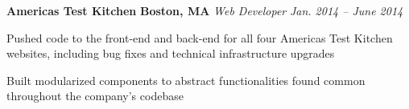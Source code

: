 \item
\headerrow
{\textbf{Americas Test Kitchen}}
{\textbf{Boston, MA}}
\headerrow
{\emph{Web Developer}}
{\emph{Jan. 2014 -- June 2014}}
\begin{itemize*}
    \item Pushed code to the front-end and back-end for all four Americas Test
    Kitchen websites, including bug fixes and technical infrastructure
    upgrades
    \item Built modularized components to abstract functionalities found common
    throughout the company's codebase
\end{itemize*}

